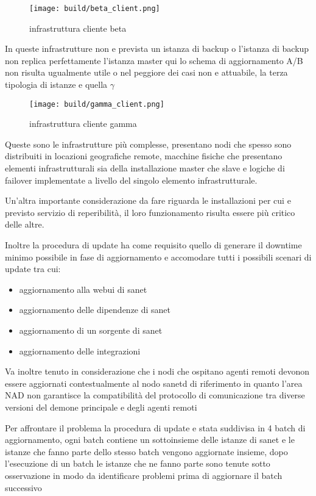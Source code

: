 \begin{figure}[H]
    \centering
    \texttt{[image: build/beta\_client.png]}
    \caption{infrastruttura cliente beta}
    \label{fig:enter-label}
\end{figure}

In queste infrastrutture non e prevista un istanza di backup o l'istanza di backup non replica perfettamente l'istanza master qui lo schema di aggiornamento A/B non risulta ugualmente utile o nel peggiore dei casi non e attuabile, la terza tipologia di istanze e quella \(\gamma\)

\begin{figure}[H]
    \centering
    \texttt{[image: build/gamma\_client.png]}
    \caption{infrastruttura cliente gamma}
    \label{fig:enter-label}
\end{figure}

Queste sono le infrastrutture più complesse, presentano nodi che spesso sono distribuiti in locazioni geografiche remote, macchine fisiche che presentano elementi infrastrutturali sia della installazione master che slave e logiche di failover implementate a livello del singolo elemento infrastrutturale.

Un'altra importante considerazione da fare riguarda le installazioni per cui e previsto servizio di reperibilità, il loro funzionamento risulta essere più critico delle altre.

Inoltre la procedura di update ha come requisito quello di generare il downtime minimo possibile in fase di aggiornamento e accomodare tutti i possibili scenari di update tra cui:

\begin{itemize}
  \item{aggiornamento alla webui di sanet}
  \item{aggiornamento delle dipendenze di sanet}
  \item{aggiornamento di un sorgente di sanet}
  \item{aggiornamento delle integrazioni}
\end{itemize}

Va inoltre tenuto in considerazione che i nodi che ospitano agenti remoti devonon essere aggiornati contestualmente al nodo sanetd di riferimento in quanto l'area NAD non garantisce la compatibilità del protocollo di comunicazione tra diverse versioni del demone principale e degli agenti remoti

Per affrontare il problema la procedura di update e stata suddivisa in 4 batch di aggiornamento, ogni batch contiene un sottoinsieme delle istanze di sanet e le istanze che fanno parte dello stesso batch vengono aggiornate insieme, dopo l'esecuzione di un batch le istanze che ne fanno parte sono tenute sotto osservazione in modo da identificare problemi prima di aggiornare il batch successivo

